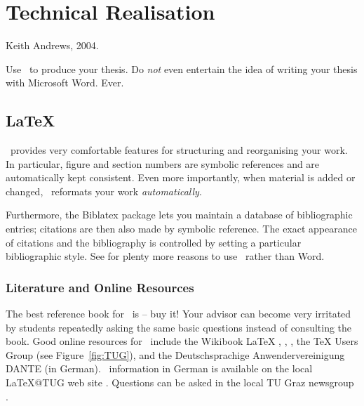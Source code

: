 %
%
% 
% 
% 


\chapter{Technical Realisation}

\label{chap:Tech}


{
Keith Andrews, 2004.
}



Use \LaTeXe\ to produce your thesis. Do \emph{not} even entertain the
idea of writing your thesis with Microsoft Word. Ever.



\section{LaTeX}

\LaTeXe\ provides very comfortable features for structuring and
reorganising your work. In particular, figure and section numbers are
symbolic references and are automatically kept consistent. Even more
importantly, when material is added or changed, \LaTeXe\ reformats
your work \emph{automatically}.

Furthermore, the Biblatex package lets you maintain a database of
bibliographic entries; citations are then also made by symbolic
reference. The exact appearance of citations and the bibliography is
controlled by setting a particular bibliographic style.
See \textcite{WordProcessors} for plenty more reasons to use \LaTeXe\
rather than Word.



\subsection{Literature and Online Resources}

The best reference book for \LaTeXe\ is \textcite{KopkaDaly} -- buy it!
Your advisor can become very irritated by students repeatedly asking
the same basic questions instead of consulting the book.
%
Good online resources for \LaTeXe\ include the Wikibook LaTeX
\parencite{Wikibooks-latex}, \textcite{NotShortIntroLaTeX},
\textcite{FormattingInformation}, the TeX Users Group \parencite{TUG} (see
Figure~\ref{fig:TUG}), and the Deutschsprachige Anwendervereinigung
DANTE \parencite{DANTE} (in German).
%
\LaTeXe\ information in German is available on the local LaTeX@TUG web
site \parencite{LatexTUGraz}. Questions can be asked in the local TU Graz
newsgroup \news{tu-graz.latex}.




